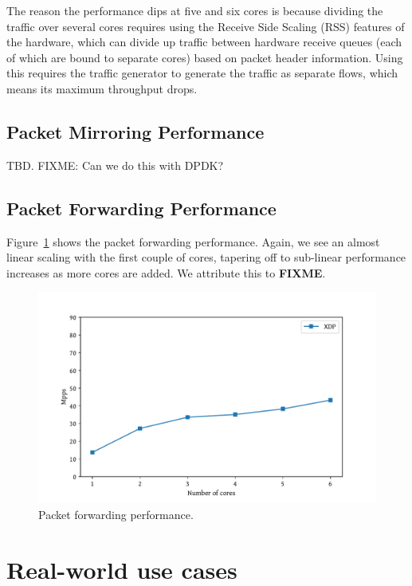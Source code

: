 \documentclass[10pt,sigconf]{acmart}
\begin{document}
The reason the performance dips at five and six cores is because dividing the
traffic over several cores requires using the Receive Side Scaling (RSS)
features of the hardware, which can divide up traffic between hardware receive
queues (each of which are bound to separate cores) based on packet header
information. Using this requires the traffic generator to generate the traffic
as separate flows, which means its maximum throughput drops.

\subsection{Packet Mirroring Performance}
\label{sec:pack-mirr-perf}

TBD. FIXME: Can we do this with DPDK?

\subsection{Packet Forwarding Performance}
\label{sec:pack-forw-perf}
Figure~\ref{fig:redirect-test} shows the packet forwarding performance. Again,
we see an almost linear scaling with the first couple of cores, tapering off to
sub-linear performance increases as more cores are added. We attribute this to
\textbf{FIXME}.


\begin{figure}[t]
\centering
\includegraphics[width=\linewidth]{figures/redirect-test.pdf}
\caption{\label{fig:redirect-test} Packet forwarding performance.}
\end{figure}



\section{Real-world use cases}
\label{sec:usecases}
\end{document}
